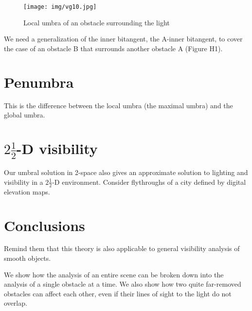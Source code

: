 \documentclass[9pt]{article}
\begin{document}
\begin{figure}[h]
\begin{center}
\texttt{[image: img/vg10.jpg]}
\end{center}
\caption{Local umbra of an obstacle surrounding the light}
\end{figure}

\begin{rmk}
We need a generalization of the inner bitangent, the A-inner bitangent,
to cover the case of an obstacle B that surrounds another obstacle A (Figure H1).
\end{rmk}


\section{Penumbra}

This is the difference between the local umbra (the maximal umbra)
and the global umbra.


\section{$2 \frac{1}{2}$-D visibility}

Our umbral solution in 2-space also gives an approximate solution
to lighting and visibility in a $2 \frac{1}{2}$-D environment.
Consider flythroughs of a city defined by digital elevation maps.


\section{Conclusions}

Remind them that this theory is also applicable to general visibility
analysis of smooth objects.

We show how the analysis of an entire scene can be broken down into
the analysis of a single obstacle at a time.
We also show how two quite far-removed obstacles can affect each other,
even if their lines of sight to the light do not overlap.
\end{document}
